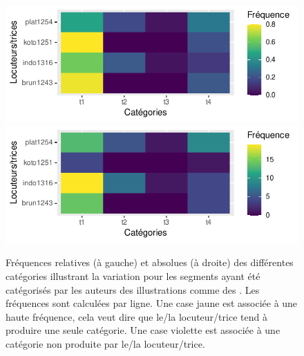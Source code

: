 \begin{figure}
	\centering
	\includegraphics[width=0.45\linewidth]{substance/images/variation_trillother}
	\includegraphics[width=0.45\linewidth]{substance/images/variation_trillother_abs}
	\caption[Fréquences relatives des différentes catégories illustrant la variation pour les segments ayant été catégorisés comme des ]{Fréquences relatives (à gauche) et absolues (à droite) des différentes catégories illustrant la variation pour les segments ayant été catégorisés par les auteurs des illustrations comme des . Les fréquences sont calculées par ligne. Une case jaune est associée à une haute fréquence, cela veut dire que le/la locuteur/trice tend à produire une seule catégorie. Une case violette est associée à une catégorie non produite par le/la locuteur/trice.}
	\label{fig:variationtrillother}
\end{figure}


